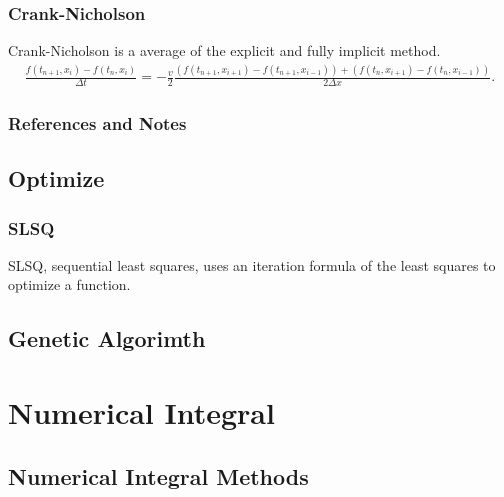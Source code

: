 \documentclass[letterpaper,12pt,english]{sphinxmanual}
\begin{document}
\subsection{Crank-Nicholson}
\label{\detokenize{finite-difference/pde/index:crank-nicholson}}
Crank-Nicholson is a average of the explicit and fully implicit method.
\begin{equation*}
\begin{split}\frac{ f( t_{n+1} , x_i ) - f( t_{n} , x_i ) }{ \Delta t } = - \frac{v}{2} \frac{ \left(f(t_{n+1}, x_{i+1}) - f(t_{n+1}, x_{i-1}) \right) + \left( f(t_{n}, x_{i+1}) - f(t_{n}, x_{i-1}) \right)}{ 2\Delta x }.\end{split}
\end{equation*}

\subsection{References and Notes}
\label{\detokenize{finite-difference/pde/index:references-and-notes}}

\section{Optimize}
\label{\detokenize{finite-difference/optimize::doc}}\label{\detokenize{finite-difference/optimize:optimize}}

\subsection{SLSQ}
\label{\detokenize{finite-difference/optimize:slsq}}
SLSQ, sequential least squares, uses an iteration formula of the least squares to optimize a function.


\section{Genetic Algorimth}
\label{\detokenize{finite-difference/gene::doc}}\label{\detokenize{finite-difference/gene:genetic-algorimth}}

\chapter{Numerical Integral}
\label{\detokenize{integral/index::doc}}\label{\detokenize{integral/index:numerical-integral}}

\section{Numerical Integral Methods}
\label{\detokenize{integral/methods::doc}}\label{\detokenize{integral/methods:numerical-integral-methods}}
\end{document}
